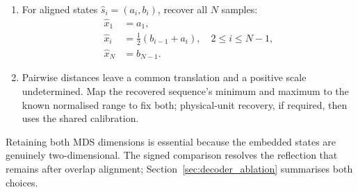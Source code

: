 \documentclass[preprint,12pt]{elsarticle}
\begin{document}
\begin{enumerate}
For fixed \(\eta\), the raw overlap residual is linear in \((\cos\theta,\sin\theta)\):
\[
b_i-a_{i+1}=A_i\cos\theta+B_i\sin\theta,
\quad
\begin{aligned}
A_i&=\eta Y_{i2}-Y_{i+1,1},\\
B_i&=-\eta Y_{i1}-Y_{i+1,2}.
\end{aligned}
\]
Hence for any \(\theta\) the optimal translation is the negated mean residual, \(\delta^\star=-\frac{1}{N-2}\sum_i(b_i-a_{i+1})\), and substituting it simply mean-centres the two coefficients. With \(\tilde A_i=A_i-\bar A\), \(\tilde B_i=B_i-\bar B\), and \(\tilde C=[\,\tilde A\;\;\tilde B\,]\in\mathbb R^{(N-2)\times2}\), the profiled objective is the quadratic form
\[
J\bigl(\theta,\delta^\star\bigr)=u^\top H_\eta u,
\qquad
H_\eta=\tilde C^\top\tilde C,
\qquad
u=\begin{bmatrix}\cos\theta\\ \sin\theta\end{bmatrix}.
\]
Because \(\lVert u\rVert=1\), minimising this Rayleigh quotient over the unit circle is an eigenproblem: the minimiser is the unit eigenvector of the symmetric \(2\times2\) matrix \(H_\eta\) belonging to its smaller eigenvalue. Both signs \(\pm u\) attain the same minimum, so the two parities give exactly four globally optimal candidates and no angular discretisation is required. Among them, select the orientation whose regenerated signed RP is closest to \(R^{\mathrm{obs}}\) in Frobenius norm, comparing both after normalisation to unit norm so the choice (and any tie among near-minimisers) is resolved independently of the unknown positive scale.
\item For aligned states \(\hat s_i=(a_i,b_i)\), recover all \(N\) samples:
\[
\begin{aligned}
\hat x_1 &= a_1,\\
\hat x_i &= \tfrac12(b_{i-1}+a_i),\quad 2\le i\le N-1,\\
\hat x_N &= b_{N-1}.
\end{aligned}
\]
\item Pairwise distances leave a common translation and a positive scale undetermined. Map the recovered sequence's minimum and maximum to the known normalised range to fix both; physical-unit recovery, if required, then uses the shared calibration.
\end{enumerate}

Retaining both MDS dimensions is essential because the embedded states are genuinely two-dimensional. The signed comparison resolves the reflection that remains after overlap alignment; Section~\ref{sec:decoder_ablation} summarises both choices.
\end{document}
